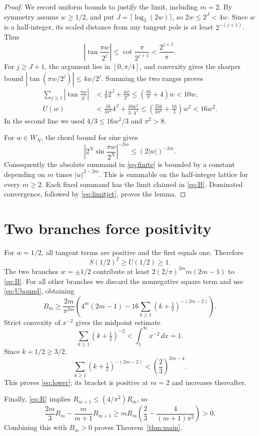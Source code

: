 \documentclass[11pt,a4paper]{article}
\theoremstyle{remark}\newtheorem*{ednote}{Editorial note (ProveIt, 2026-10-01)}
\begin{document}
\begin{proof}
We record uniform bounds to justify the limit, including $m=2$. By symmetry assume $w\ge1/2$, and put $J=\lceil\log_2(2w)\rceil$, so $2w\le2^J<4w$. Since $w$ is a half-integer, its scaled distance from any tangent pole is at least $2^{-(j+1)}$. Thus
\[
 \left|\tan\frac{\pi w}{2^j}\right|
 \le\cot\frac{\pi}{2^{j+1}}<\frac{2^{j+1}}\pi.
\]
For $j\ge J+1$, the argument lies in $[0,\pi/4]$, and convexity gives the sharper bound $|\tan(\pi w/2^j)|\le4w/2^j$. Summing the two ranges proves
\begin{align}
 \sum_{j\ge1}\left|\tan\frac{\pi w}{2^j}\right|
 &<\frac4\pi2^J+\frac{4w}{2^J}
 \le\left(\frac{16}\pi+4\right)w<10w,\label{eq:Sbound}\\
 U(w)&<\frac{16}{3\pi^2}4^J+\frac{16w^2}{3\cdot4^J}
 \le\left(\frac{256}{3\pi^2}+\frac{16}3\right)w^2<16w^2.
 \label{eq:Ubound}
\end{align}
In the second line we used $4/3\le16w^2/3$ and $\pi^2>8$.

For $w\in W_N$, the chord bound for sine gives
\[
 \left|2^N\sin\frac{\pi w}{2^N}\right|^{-2m}
 \le(2|w|)^{-2m}.
\]
Consequently the absolute summand in \eqref{eq:finite} is bounded by a constant depending on $m$ times $|w|^{2-2m}$. This is summable on the half-integer lattice for every $m\ge2$. Each fixed summand has the limit claimed in \eqref{eq:B}. Dominated convergence, followed by \eqref{eq:limitjet}, proves the lemma.
\end{proof}

\section{Two branches force positivity}
For $w=1/2$, all tangent terms are positive and the first equals one. Therefore
\[
 S(1/2)^2\ge U(1/2)\ge1.
\]
The two branches $w=\pm1/2$ contribute at least
$2(2/\pi)^{2m}m(2m-1)$ to \eqref{eq:B}. For all other branches we discard the nonnegative square term and use \eqref{eq:Ubound}, obtaining
\[
 B_m\ge\frac{2m}{\pi^{2m}}\left(
 4^m(2m-1)-16\sum_{k\ge1}(k+\tfrac12)^{-(2m-2)}\right).
\]
Strict convexity of $x^{-2}$ gives the midpoint estimate
\[
 \sum_{k\ge1}(k+\tfrac12)^{-2}<\int_1^\infty x^{-2}\,dx=1.
\]
Since $k+1/2\ge3/2$,
\[
 \sum_{k\ge1}(k+\tfrac12)^{-(2m-2)}
 <\left(\frac23\right)^{2m-4}.
\]
This proves \eqref{eq:lower}; its bracket is positive at $m=2$ and increases thereafter.

Finally, \eqref{eq:R} implies $R_{m+1}\le(4/\pi^2)R_m$, so
\[
 \frac{2m}{3}R_m-\frac{m}{m+1}R_{m+1}
 \ge mR_m\left(\frac23-\frac4{(m+1)\pi^2}\right)>0.
\]
Combining this with $B_m>0$ proves Theorem~\ref{thm:main}.
\end{document}
